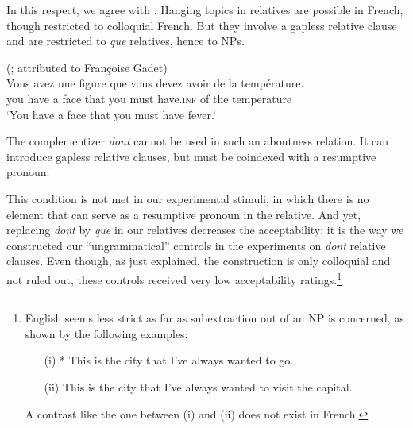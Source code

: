 In this respect, we agree with \citeauthor{Haegeman.2014}. Hanging topics in relatives are possible in French, though restricted to colloquial French. But they involve a gapless relative clause and are restricted to \emph{que} relatives, hence to NPs.

\ea (\citealt[42]{Abeille.2007.Relatives}; attributed to Fran\c{c}oise Gadet)\\
\gll Vous avez une figure que vous devez avoir de la température.\\
you have a face that you must have\textsc{.inf} of the temperature\\
\glt `You have a face that you must have fever.'
\z 


The complementizer \emph{dont} cannot be used in such an aboutness relation. It can introduce gapless relative clauses, but must be coindexed with a resumptive pronoun.

\begin{exe}
\ex \citep[21--22]{Godard.1985}
\begin{xlist}
\end{xlist}
\end{exe}

This condition is not met in our experimental stimuli, in which there is no element that can serve as a resumptive pronoun in the relative. And yet, replacing \emph{dont} by \emph{que} in our relatives decreases the acceptability: it is the way we constructed our ``ungrammatical'' controls in the experiments on \emph{dont} relative clauses. Even though, as just explained, the construction is only colloquial and not ruled out, these controls received very low acceptability ratings.\footnote{English seems less strict as far as subextraction out of an NP is concerned, as shown by the following examples:

\begin{itemize}
    \item[(i) *] This is the city that I've always wanted to go.
    \item[(ii) ] This is the city that I've always wanted to visit the capital. \citep[examples from][59]{Chaves.2020.UDC}
\end{itemize}

A contrast like the one between (i) and (ii) does not exist in French.}

